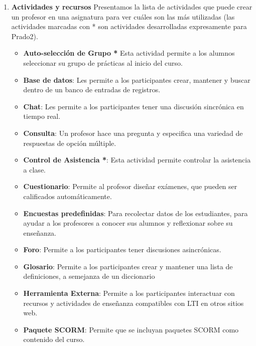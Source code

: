 \begin{enumerate}
  \item \textbf{Actividades y recursos} Presentamos la lista de actividades que puede crear un profesor en una asignatura para ver cuáles son las más utilizadas (las actividades marcadas con * son actividades desarrolladas expresamente para Prado2).


        \begin{itemize}
            \item \textbf{Auto-selección de Grupo *} Esta actividad permite a los alumnos seleccionar su grupo de prácticas al inicio del curso.

            \item \textbf{Base de datos}: Les permite a los participantes crear, mantener y buscar dentro de un banco de entradas de registros.

            \item \textbf{Chat}: Les permite a los participantes tener una discusión sincrónica en tiempo real.

            \item \textbf{Consulta}: Un profesor hace una pregunta y especifica una variedad de respuestas de opción múltiple.

            \item \textbf{Control de Asistencia *}: Esta actividad permite controlar la asistencia a clase.

            \item \textbf{Cuestionario}: Permite al profesor diseñar exámenes, que pueden ser calificados automáticamente.

            \item \textbf{Encuestas predefinidas}: Para recolectar datos de los estudiantes, para ayudar a los profesores a conocer sus alumnos y reflexionar sobre su enseñanza.

            \item \textbf{Foro}: Permite a los participantes tener discusiones asincrónicas.

            \item \textbf{Glosario}: Permite a los participantes crear y mantener una lista de definiciones, a semejanza de un diccionario

            \item \textbf{Herramienta Externa}: Permite a los participantes interactuar con recursos y actividades de enseñanza compatibles con LTI en otros sitios web.

            \item \textbf{Paquete SCORM}: Permite que se incluyan paquetes SCORM como contenido del curso.


\end{itemize}
\end{enumerate}
